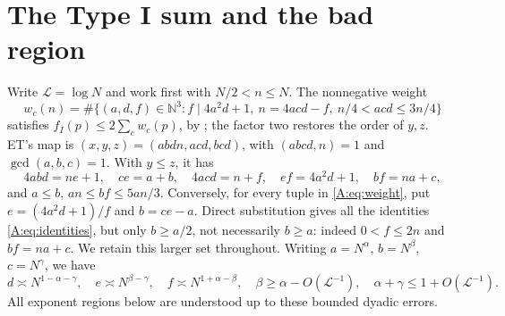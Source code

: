 \documentclass[10pt,reqno]{amsart}
\theoremstyle{definition}
\numberwithin{equation}{section}
\newcommand{\N}{\mathbb N}
\newcommand{\cL}{\mathcal L}
\begin{document}
\section{The Type I sum and the bad region}\label{sec:reduction}
Write $\cL=\log N$ and work first with $N/2<n\le N$. The nonnegative weight
\begin{equation}\label{A:eq:weight}
 w_c(n)=\#\{(a,d,f)\in\N^3:f\mid4a^2d+1,\ n=4acd-f,
                         \ n/4<acd\le3n/4\}
\end{equation}
satisfies $f_I(p)\le2\sum_c w_c(p)$, by \cite[Proposition~2.2,
Lemma~2.8]{ET}; the factor two restores the order of $y,z$.
ET's map is $(x,y,z)=(abdn,acd,bcd)$, with $(abcd,n)=1$ and
$\gcd(a,b,c)=1$. With $y\le z$, it has
\begin{equation}\label{A:eq:identities}
 4abd=ne+1,\quad ce=a+b,\quad4acd=n+f,\quad
 ef=4a^2d+1,\quad bf=na+c,
\end{equation}
and $a\le b$, $an\le bf\le5an/3$.
Conversely, for every tuple in \eqref{A:eq:weight}, put
$e=(4a^2d+1)/f$ and $b=ce-a$. Direct substitution gives all the identities
\eqref{A:eq:identities}, but only $b\ge a/2$, not necessarily $b\ge a$:
indeed $0<f\le2n$ and $bf=na+c$. We retain this larger set throughout.
Writing $a=N^\alpha$, $b=N^\beta$, $c=N^\gamma$, we have
\begin{equation}\label{A:eq:exponents}
 d\asymp N^{1-\alpha-\gamma},\quad e\asymp N^{\beta-\gamma},\quad
 f\asymp N^{1+\alpha-\beta},\quad
 \beta\ge\alpha-O(\cL^{-1}),\quad\alpha+\gamma\le1+O(\cL^{-1}).
\end{equation}
All exponent regions below are understood up to these bounded dyadic errors.
\end{document}
